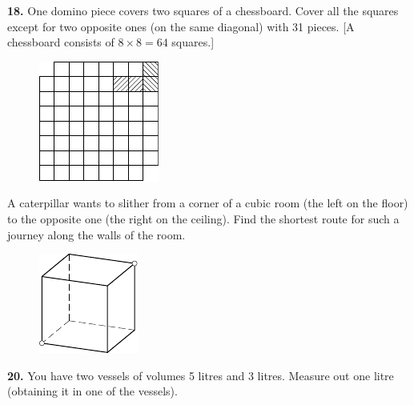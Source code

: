\documentclass[12pt]{article}  %
\begin{document}
\medskip\noindent
{\bf 18.} One domino piece covers two squares of a chessboard. 
Cover all the squares
except for two opposite ones (on the same diagonal) with 31 pieces. [A chessboard consists of $8 \times 8 = 64$ squares.]
\begin{figure}[h]
\centering
\footnotesize
\includegraphics[scale=1]{taskbook-2}
\end{figure}

 A caterpillar wants to slither from a corner of a cubic room (the left on the floor) to the opposite one
(the right on the ceiling).
Find the shortest route for such a journey along the walls of the room.
\begin{figure}[h]
\centering
\footnotesize
\includegraphics[scale=1]{taskbook-3}
\end{figure}
\newline\newline\quad
{\bf 20.} You have two vessels of volumes 5 litres and 3 litres. Measure out one litre (obtaining it in one of the vessels).
\end{document}
